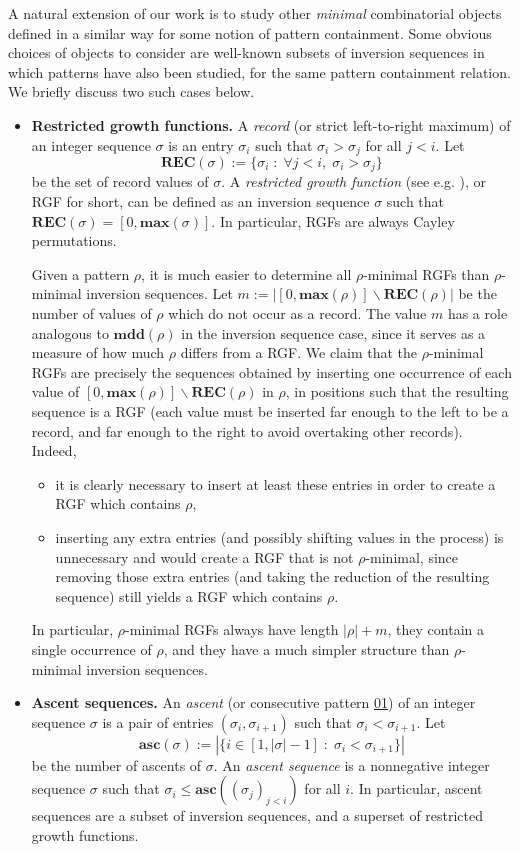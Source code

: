 \documentclass[a4paper,11pt]{article}
\theoremstyle{definition}
\theoremstyle{remark}
\renewcommand{\max}{\mathbf{max}}
\newcommand{\mdd}{\mathbf{mdd}}
\newcommand{\REC}{\mathbf{REC}}
\newcommand{\asc}{\mathbf{asc}}
\begin{document}
A natural extension of our work is to study other \emph{minimal} combinatorial objects defined in a similar way for some notion of pattern containment. Some obvious choices of objects to consider are well-known subsets of inversion sequences in which patterns have also been studied, for the same pattern containment relation. We briefly discuss two such cases below.
\begin{itemize}
    \item \textbf{Restricted growth functions.} A \emph{record} (or strict left-to-right maximum) of an integer sequence $\sigma$ is an entry $\sigma_i$ such that $\sigma_i > \sigma_j$ for all $j < i$. 
    Let $$\REC(\sigma) := \{\sigma_i \; : \; \forall j<i, \; \sigma_i > \sigma_j\}$$ be the set of record values of $\sigma$. A \emph{restricted growth function} (see e.g. \cite{Bean_Bell_Ollson_2025}), or RGF for short, can be defined as an inversion sequence $\sigma$ such that $\REC(\sigma) = [0, \max(\sigma)]$. In particular, RGFs are always Cayley permutations.

    Given a pattern $\rho$, it is much easier to determine all $\rho$-minimal RGFs than $\rho$-minimal inversion sequences.
    Let $m := |[0,\max(\rho)] \backslash \REC(\rho)|$ be the number of values of $\rho$ which do not occur as a record. The value $m$ has a role analogous to $\mdd(\rho)$ in the inversion sequence case, since it serves as a measure of how much $\rho$ differs from a RGF. We claim that the $\rho$-minimal RGFs are precisely the sequences obtained by inserting one occurrence of each value of $[0,\max(\rho)] \backslash \REC(\rho)$ in $\rho$, in positions such that the resulting sequence is a RGF (each value must be inserted far enough to the left to be a record, and far enough to the right to avoid overtaking other records).    Indeed,
    \begin{itemize}
        \item it is clearly necessary to insert at least these entries in order to create a RGF which contains $\rho$,
        \item inserting any extra entries (and possibly shifting values in the process) is unnecessary and would create a RGF that is not $\rho$-minimal, since removing those extra entries (and taking the reduction of the resulting sequence) still yields a RGF which contains $\rho$.
    \end{itemize}
    In particular, $\rho$-minimal RGFs always have length $|\rho| + m$, they contain a single occurrence of $\rho$, and they have a much simpler structure than $\rho$-minimal inversion sequences.
    \item \textbf{Ascent sequences.} An \emph{ascent} (or consecutive pattern \underline{01}) of an integer sequence $\sigma$ is a pair of entries $(\sigma_i, \sigma_{i+1})$ such that $\sigma_i < \sigma_{i+1}$.
    Let $$\asc(\sigma) := |\{i \in [1,|\sigma|-1] \; : \; \sigma_i < \sigma_{i+1}\}|$$ be the number of ascents of $\sigma$. An \emph{ascent sequence} \cite{ascent_sequences_2010} is a nonnegative integer sequence $\sigma$ such that $\sigma_i \leq \asc((\sigma_j)_{j < i})$ for all $i$. In particular, ascent sequences are a subset of inversion sequences, and a superset of restricted growth functions.


\end{itemize}
\end{document}
